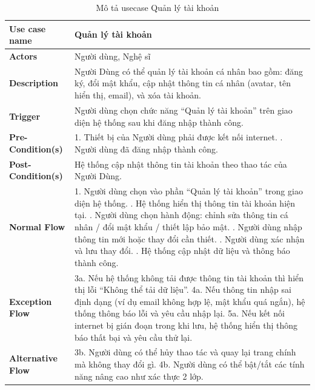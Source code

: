 \documentclass[a4paper]{article}
\begin{document}
\begin{table}[h!]
\centering
\renewcommand{\arraystretch}{1.3} %
\begin{tabularx}{\textwidth}{|l|X|}
\hline
\textbf{Use case name} & Quản lý tài khoản \\ \hline
\textbf{Actors}        & Người dùng, Nghệ sĩ \\ \hline
\textbf{Description}   & Người Dùng có thể quản lý tài khoản cá nhân bao gồm: đăng ký, đổi mật khẩu, cập nhật thông tin cá nhân (avatar, tên hiển thị, email), và xóa tài khoản. \\ \hline
\textbf{Trigger}       & Người dùng chọn chức năng “Quản lý tài khoản” trên giao diện hệ thống sau khi đăng nhập thành công. \\ \hline
\textbf{Pre-Condition(s)} 
& 1. Thiết bị của Người dùng phải được kết nối internet. \newline
  2. Người dùng đã đăng nhập thành công. \\ \hline
\textbf{Post-Condition(s)} 
& Hệ thống cập nhật thông tin tài khoản theo thao tác của Người Dùng. \\ \hline
\textbf{Normal Flow}   
& 1. Người dùng chọn vào phần “Quản lý tài khoản” trong giao diện hệ thống. \newline
  2. Hệ thống hiển thị thông tin tài khoản hiện tại. \newline
  3. Người dùng chọn hành động: chỉnh sửa thông tin cá nhân / đổi mật khẩu / thiết lập bảo mật. \newline
  4. Người dùng nhập thông tin mới hoặc thay đổi cần thiết. \newline
  5. Người dùng xác nhận và lưu thay đổi. \newline
  6. Hệ thống cập nhật dữ liệu và thông báo thành công. \\ \hline
\textbf{Exception Flow} 
& 3a. Nếu hệ thống không tải được thông tin tài khoản thì hiển thị lỗi “Không thể tải dữ liệu”. \newline
  4a. Nếu thông tin nhập sai định dạng (ví dụ email không hợp lệ, mật khẩu quá ngắn), hệ thống thông báo lỗi và yêu cầu nhập lại. \newline
  5a. Nếu kết nối internet bị gián đoạn trong khi lưu, hệ thống hiển thị thông báo thất bại và yêu cầu thử lại. \\ \hline
\textbf{Alternative Flow} 
& 3b. Người dùng có thể hủy thao tác và quay lại trang chính mà không thay đổi gì. \newline
  4b. Người dùng có thể bật/tắt các tính năng nâng cao như xác thực 2 lớp. \\ \hline
\end{tabularx}
\caption{Mô tả usecase Quản lý tài khoản}
\end{table}
\end{document}
